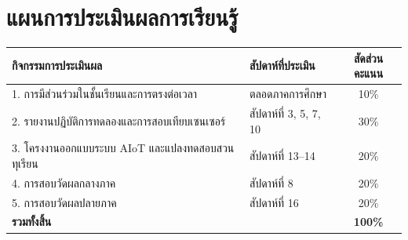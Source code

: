 \section*{แผนการประเมินผลการเรียนรู้}
\begin{table}[H]
\centering\small
\begin{tabularx}{\textwidth}{p{} p{} c}
\toprule
\textbf{กิจกรรมการประเมินผล} & \textbf{สัปดาห์ที่ประเมิน} & \textbf{สัดส่วนคะแนน} \\
\midrule
1. การมีส่วนร่วมในชั้นเรียนและการตรงต่อเวลา & ตลอดภาคการศึกษา & 10\% \\
2. รายงานปฏิบัติการทดลองและการสอบเทียบเซนเซอร์ & สัปดาห์ที่ 3, 5, 7, 10 & 30\% \\
3. โครงงานออกแบบระบบ AIoT และแปลงทดสอบสวนทุเรียน & สัปดาห์ที่ 13--14 & 20\% \\
4. การสอบวัดผลกลางภาค & สัปดาห์ที่ 8 & 20\% \\
5. การสอบวัดผลปลายภาค & สัปดาห์ที่ 16 & 20\% \\
\midrule
\textbf{รวมทั้งสิ้น} & & \textbf{100\%} \\
\bottomrule
\end{tabularx}
\end{table}
